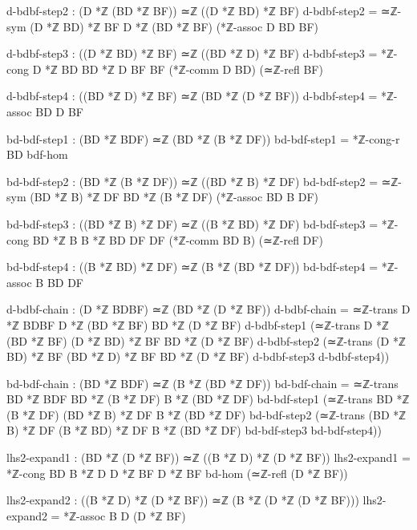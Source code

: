\documentclass[11pt,a4paper]{book}
\begin{document}
\begin{code}
        d-bdbf-step2 : (D *ℤ (BD *ℤ BF)) ≃ℤ ((D *ℤ BD) *ℤ BF)
        d-bdbf-step2 = ≃ℤ-sym {(D *ℤ BD) *ℤ BF} {D *ℤ (BD *ℤ BF)} (*ℤ-assoc D BD BF)
        
        d-bdbf-step3 : ((D *ℤ BD) *ℤ BF) ≃ℤ ((BD *ℤ D) *ℤ BF)
        d-bdbf-step3 = *ℤ-cong {D *ℤ BD} {BD *ℤ D} {BF} {BF} (*ℤ-comm D BD) (≃ℤ-refl BF)
        
        d-bdbf-step4 : ((BD *ℤ D) *ℤ BF) ≃ℤ (BD *ℤ (D *ℤ BF))
        d-bdbf-step4 = *ℤ-assoc BD D BF
        
        bd-bdf-step1 : (BD *ℤ BDF) ≃ℤ (BD *ℤ (B *ℤ DF))
        bd-bdf-step1 = *ℤ-cong-r BD bdf-hom
        
        bd-bdf-step2 : (BD *ℤ (B *ℤ DF)) ≃ℤ ((BD *ℤ B) *ℤ DF)
        bd-bdf-step2 = ≃ℤ-sym {(BD *ℤ B) *ℤ DF} {BD *ℤ (B *ℤ DF)} (*ℤ-assoc BD B DF)
        
        bd-bdf-step3 : ((BD *ℤ B) *ℤ DF) ≃ℤ ((B *ℤ BD) *ℤ DF)
        bd-bdf-step3 = *ℤ-cong {BD *ℤ B} {B *ℤ BD} {DF} {DF} (*ℤ-comm BD B) (≃ℤ-refl DF)
        
        bd-bdf-step4 : ((B *ℤ BD) *ℤ DF) ≃ℤ (B *ℤ (BD *ℤ DF))
        bd-bdf-step4 = *ℤ-assoc B BD DF
        
        d-bdbf-chain : (D *ℤ BDBF) ≃ℤ (BD *ℤ (D *ℤ BF))
        d-bdbf-chain = ≃ℤ-trans {D *ℤ BDBF} {D *ℤ (BD *ℤ BF)} {BD *ℤ (D *ℤ BF)}
                        d-bdbf-step1
                        (≃ℤ-trans {D *ℤ (BD *ℤ BF)} {(D *ℤ BD) *ℤ BF} {BD *ℤ (D *ℤ BF)}
                          d-bdbf-step2
                          (≃ℤ-trans {(D *ℤ BD) *ℤ BF} {(BD *ℤ D) *ℤ BF} {BD *ℤ (D *ℤ BF)}
                            d-bdbf-step3 d-bdbf-step4))
        
        bd-bdf-chain : (BD *ℤ BDF) ≃ℤ (B *ℤ (BD *ℤ DF))
        bd-bdf-chain = ≃ℤ-trans {BD *ℤ BDF} {BD *ℤ (B *ℤ DF)} {B *ℤ (BD *ℤ DF)}
                        bd-bdf-step1
                        (≃ℤ-trans {BD *ℤ (B *ℤ DF)} {(BD *ℤ B) *ℤ DF} {B *ℤ (BD *ℤ DF)}
                          bd-bdf-step2
                          (≃ℤ-trans {(BD *ℤ B) *ℤ DF} {(B *ℤ BD) *ℤ DF} {B *ℤ (BD *ℤ DF)}
                            bd-bdf-step3 bd-bdf-step4))
        
        lhs2-expand1 : (BD *ℤ (D *ℤ BF)) ≃ℤ ((B *ℤ D) *ℤ (D *ℤ BF))
        lhs2-expand1 = *ℤ-cong {BD} {B *ℤ D} {D *ℤ BF} {D *ℤ BF} bd-hom (≃ℤ-refl (D *ℤ BF))
        
        lhs2-expand2 : ((B *ℤ D) *ℤ (D *ℤ BF)) ≃ℤ (B *ℤ (D *ℤ (D *ℤ BF)))
        lhs2-expand2 = *ℤ-assoc B D (D *ℤ BF)
        

\end{code}
\end{document}
